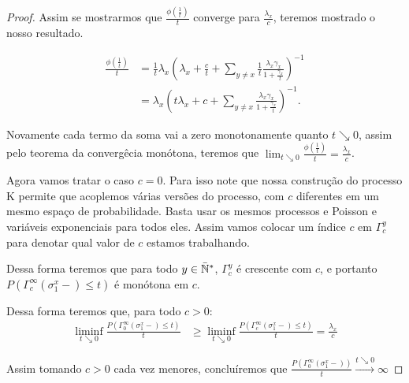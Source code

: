 \begin{proof}
  Assim se mostrarmos que $\frac{\phi(\frac{1}{t})}{t}$ converge para
  $\frac{\lambda_x}{c}$, teremos mostrado o nosso resultado.

  \begin{align*}
    \frac{\phi(\frac{1}{t})}{t} &= \frac{1}{t} \lambda_x \left(
      \lambda_x + \frac{c}{t} + \sum_{y \neq x} \frac{1}{t}
      \frac{\lambda_x \gamma_x}{1 + \frac{\gamma_x}{t}} \right)^{-1} \\
    &= \lambda_x \left( t\lambda_x + c + \sum_{y \neq x}
      \frac{\lambda_x \gamma_x}{1 + \frac{\gamma_x}{t}} \right)^{-1}.
  \end{align*}

  Novamente cada termo da soma vai a zero monotonamente quanto $t
  \searrow 0$, assim pelo teorema da convergêcia monótona, teremos que
  $\lim_{t \searrow 0} \frac{\phi(\frac{1}{t})}{t} =
  \frac{\lambda_x}{c}$.

  Agora vamos tratar o caso $c = 0$. Para isso note que nossa
  construção do processo K permite que acoplemos várias versões do
  processo, com $c$ diferentes em um mesmo espaço de
  probabilidade. Basta usar os mesmos processos e Poisson e variáveis
  exponenciais para todos eles. Assim vamos colocar um índice $c$ em
  $\Gamma^y_c$ para denotar qual valor de $c$ estamos trabalhando.

  Dessa forma teremos que para todo $y \in {\mathbb{\bar{N}^*}}$, $\Gamma^y_c$ é
  crescente com $c$, e portanto $P ( \Gamma^\infty_c(\sigma^x_1-) \leq
  t)$ é monótona em $c$.

  Dessa forma teremos que, para todo $c > 0$:
  \begin{align*}
    \liminf_{t \searrow 0} \frac{P ( \Gamma^\infty_0(\sigma^x_1-) \leq
      t)}{t} &\geq \liminf_{t \searrow 0} \frac{P (
      \Gamma^\infty_c(\sigma^x_1-) \leq t)}{t}
    = \frac{\lambda_x}{c}
  \end{align*}

  Assim tomando $c > 0$ cada vez menores, concluíremos que $\frac{P (
    \Gamma^\infty_0(\sigma^x_1-))}{t} \xrightarrow{t \searrow 0}
  \infty$
\end{proof}

